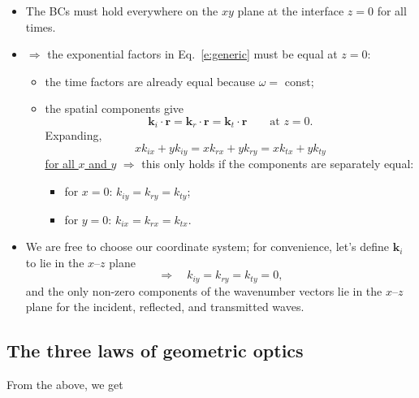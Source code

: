 \documentclass[11pt, oneside]{article}
\begin{document}
\begin{itemize}
	\item The BCs must hold everywhere on the $xy$ plane at the interface $z = 0$ for all times.
	\item[] $\Rightarrow$ the exponential factors in Eq.~\eqref{e:generic} must be equal at $z = 0$:
	\begin{itemize}
		\item the time factors are already equal because $\omega = $ const;
		\item the spatial components give
		\begin{equation}
			\mathbf{k}_i\cdot\mathbf{r} = \mathbf{k}_r\cdot\mathbf{r} = \mathbf{k}_t\cdot\mathbf{r} \qquad \text{at } z = 0.
		\end{equation}
		Expanding,
		\begin{equation}
			xk_{ix} + yk_{iy} = xk_{rx} + yk_{ry} = xk_{tx} + yk_{ty}
		\end{equation}
		\underline{\underline{for all $x$ and $y$}} $\Rightarrow$ this only holds if the components are separately equal:
		\begin{itemize}
			\item[$\hookrightarrow$] for $x = 0$: \quad $k_{iy} = k_{ry} = k_{ty}$;
			\item[$\hookrightarrow$] for $y = 0$: \quad $k_{ix} = k_{rx} = k_{tx}$.
		\end{itemize}
	\end{itemize}
	\item We are free to choose our coordinate system; for convenience, let's define $\mathbf{k}_i$ to lie in the $x$--$z$ plane
	\begin{equation}
		\Rightarrow\quad k_{iy} = k_{ry} = k_{ty} = 0,
	\end{equation}
	and the only non-zero components of the wavenumber vectors lie in the $x$--$z$ plane for the incident, reflected, and transmitted waves.
\end{itemize}

\subsection{The three laws of geometric optics}

From the above, we get

\begin{center}
\end{center}
\end{document}
